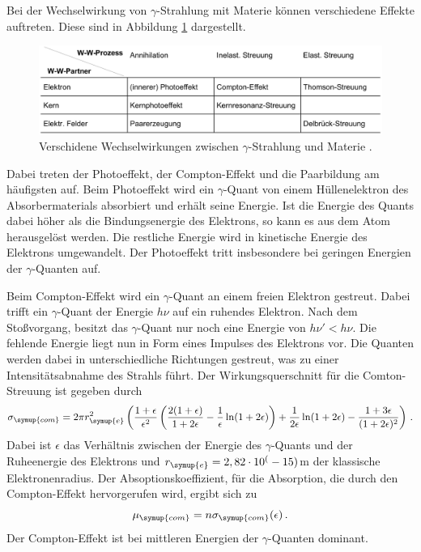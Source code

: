 Bei der Wechselwirkung von $\gamma$-Strahlung mit Materie können verschiedene
Effekte auftreten. Diese sind in Abbildung \ref{fig:wechselwirkung} dargestellt.

\begin{figure}
  \centering
  \includegraphics[width=\textwidth]{data/wechselwirkung.png}
  \caption{Verschidene Wechselwirkungen zwischen $\gamma$-Strahlung und Materie \cite{Versuchsanleitung}.}
  \label{fig:wechselwirkung}
\end{figure}

Dabei treten der Photoeffekt, der Compton-Effekt und die Paarbildung am häufigsten auf.
Beim Photoeffekt wird ein $\gamma$-Quant von einem Hüllenelektron des Absorbermaterials
absorbiert und erhält seine Energie. Ist die Energie des Quants dabei höher als die
Bindungsenergie des Elektrons, so kann es aus dem Atom herausgelöst werden. Die
restliche Energie wird in kinetische Energie des Elektrons umgewandelt. Der Photoeffekt
tritt insbesondere bei geringen Energien der $\gamma$-Quanten auf.

Beim Compton-Effekt wird ein $\gamma$-Quant an einem freien Elektron gestreut.
Dabei trifft ein $\gamma$-Quant der Energie $h \nu$ auf ein ruhendes Elektron.
Nach dem Stoßvorgang, besitzt das $\gamma$-Quant nur noch eine Energie von $h \nu' < h \nu$.
Die fehlende Energie liegt nun in Form eines Impulses des Elektrons vor. Die Quanten
werden dabei in unterschiedliche Richtungen gestreut, was zu einer Intensitätsabnahme
des Strahls führt. Der Wirkungsquerschnitt für die Comton-Streuung ist gegeben
durch
\begin{equation}
  \sigma_{\symup{com}}= 2 \pi r_{\symup{e}}^2 \left(\frac{1+\epsilon}{\epsilon^2}
  \left(\frac{2(1+\epsilon)}{1+2\epsilon}-\frac{1}{\epsilon}\ln(1+2\epsilon)\right)
  +\frac{1}{2\epsilon}\ln(1+2\epsilon)-\frac{1+3\epsilon}{(1+2\epsilon)^2}\right) \,.
  \label{eqn:sigma_compton}
\end{equation}
Dabei ist $\epsilon$ das Verhältnis zwischen der Energie des $\gamma$-Quants und
der Ruheenergie des Elektrons und $r_{\symup{e}} = 2,82 \cdot 10^(-15)$m%
der klassische Elektronenradius. Der Absoptionskoeffizient, für die Absorption, die
durch den Compton-Effekt hervorgerufen wird, ergibt sich zu
\begin{equation}
  \mu_{\symup{com}}=n \sigma_{\symup{com}}(\epsilon) \,.
  \label{eqn:mucompton}
\end{equation}
Der Compton-Effekt ist bei mittleren Energien der $\gamma$-Quanten dominant.

